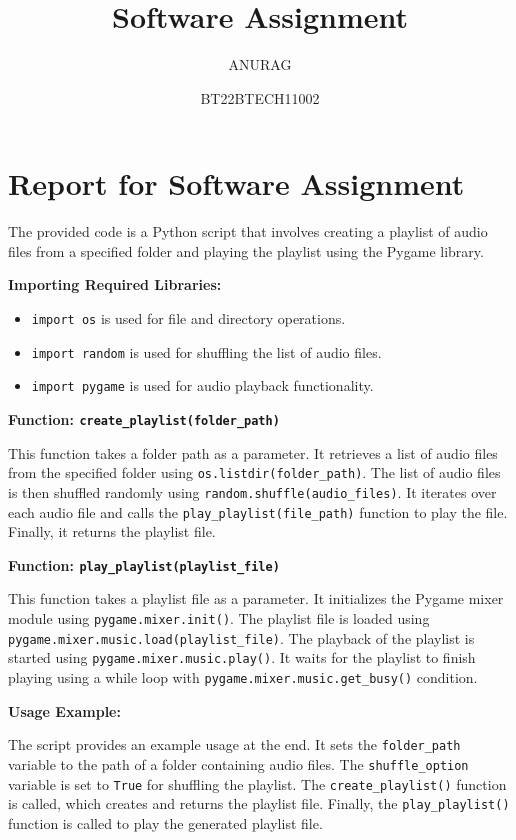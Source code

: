\documentclass{article}
\title{\Huge\centering Software Assignment}
\author{ANURAG}
\date{BT22BTECH11002}
\begin{document}
\maketitle

\section*{Report for Software Assignment}

The provided code is a Python script that involves creating a playlist of audio files from a specified folder and playing the playlist using the Pygame library.

\textbf{Importing Required Libraries:}

\begin{itemize}
    \item \texttt{import os} is used for file and directory operations.
    \item \texttt{import random} is used for shuffling the list of audio files.
    \item \texttt{import pygame} is used for audio playback functionality.
\end{itemize}

\textbf{Function: \texttt{create\_playlist(folder\_path)}}

This function takes a folder path as a parameter. It retrieves a list of audio files from the specified folder using \texttt{os.listdir(folder\_path)}. The list of audio files is then shuffled randomly using \texttt{random.shuffle(audio\_files)}. It iterates over each audio file and calls the \texttt{play\_playlist(file\_path)} function to play the file. Finally, it returns the playlist file.

\textbf{Function: \texttt{play\_playlist(playlist\_file)}}

This function takes a playlist file as a parameter. It initializes the Pygame mixer module using \texttt{pygame.mixer.init()}. The playlist file is loaded using \texttt{pygame.mixer.music.load(playlist\_file)}. The playback of the playlist is started using \texttt{pygame.mixer.music.play()}. It waits for the playlist to finish playing using a while loop with \texttt{pygame.mixer.music.get\_busy()} condition.

\textbf{Usage Example:}

The script provides an example usage at the end. It sets the \texttt{folder\_path} variable to the path of a folder containing audio files. The \texttt{shuffle\_option} variable is set to \texttt{True} for shuffling the playlist. The \texttt{create\_playlist()} function is called, which creates and returns the playlist file. Finally, the \texttt{play\_playlist()} function is called to play the generated playlist file.
\end{document}
